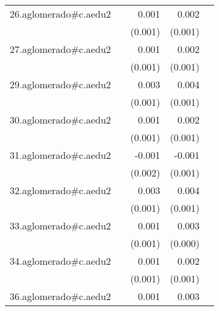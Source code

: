 {\begin{longtable}{l*{4}{D{.}{.}{-1}}}
\addlinespace
26.aglomerado#c.aedu2&                     &       0.001         &       0.002\sym{**} &                     \\
            &                     &     (0.001)         &     (0.001)         &                     \\
\addlinespace
27.aglomerado#c.aedu2&                     &       0.001         &       0.002\sym{*}  &                     \\
            &                     &     (0.001)         &     (0.001)         &                     \\
\addlinespace
29.aglomerado#c.aedu2&                     &       0.003\sym{*}  &       0.004\sym{***}&                     \\
            &                     &     (0.001)         &     (0.001)         &                     \\
\addlinespace
30.aglomerado#c.aedu2&                     &       0.001         &       0.002\sym{*}  &                     \\
            &                     &     (0.001)         &     (0.001)         &                     \\
\addlinespace
31.aglomerado#c.aedu2&                     &      -0.001         &      -0.001         &                     \\
            &                     &     (0.002)         &     (0.001)         &                     \\
\addlinespace
32.aglomerado#c.aedu2&                     &       0.003\sym{*}  &       0.004\sym{***}&                     \\
            &                     &     (0.001)         &     (0.001)         &                     \\
\addlinespace
33.aglomerado#c.aedu2&                     &       0.001         &       0.003\sym{***}&                     \\
            &                     &     (0.001)         &     (0.000)         &                     \\
\addlinespace
34.aglomerado#c.aedu2&                     &       0.001         &       0.002\sym{*}  &                     \\
            &                     &     (0.001)         &     (0.001)         &                     \\
\addlinespace
36.aglomerado#c.aedu2&                     &       0.001         &       0.003\sym{**} &                     \\

\end{longtable}}
